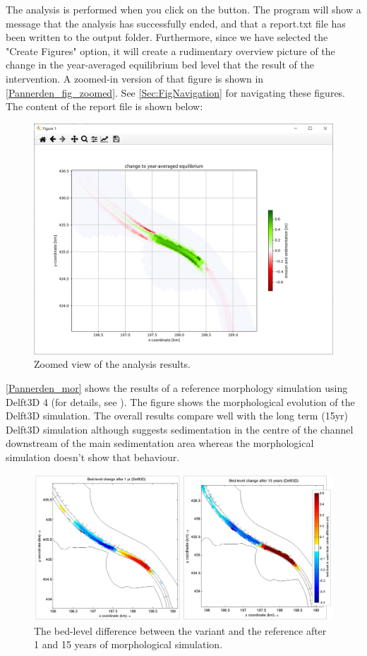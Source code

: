 
The \dfmi analysis is performed when you click on the  button.
The program will show a message that the analysis has successfully ended, and that a report.txt file has been written to the output folder.
Furthermore, since we have selected the "Create Figures" option, it will create a rudimentary overview picture of the change in the year-averaged equilibrium bed level that the result of the intervention.
A zoomed-in version of that figure is shown in \autoref{Pannerden_fig_zoomed}.
See \autoref{Sec:FigNavigation} for navigating these figures.
The content of the report file is shown below:

\begin{figure}
\center
\includegraphics[width=\textwidth]{figures/Pannerden_fig_zoomed.png}
\caption{Zoomed view of the analysis results.}
\label{Pannerden_fig_zoomed}
\end{figure}


\autoref{Pannerden_mor} shows the results of a reference morphology simulation using Delft3D 4 (for details, see \citet{GiriJagers2022}).
The figure shows the morphological evolution of the Delft3D simulation.
The overall \dfastmi results compare well with the long term (15yr) Delft3D simulation although \dfmi suggests sedimentation in the centre of the channel downstream of the main sedimentation area whereas the morphological simulation doesn't show that behaviour.

\begin{figure}[H]
\center
\includegraphics[width=\textwidth]{figures/Pannerden_mor.png}
\caption{The bed-level difference between the variant and the reference after 1 and 15 years of morphological simulation.}
\label{Pannerden_mor}
\end{figure}